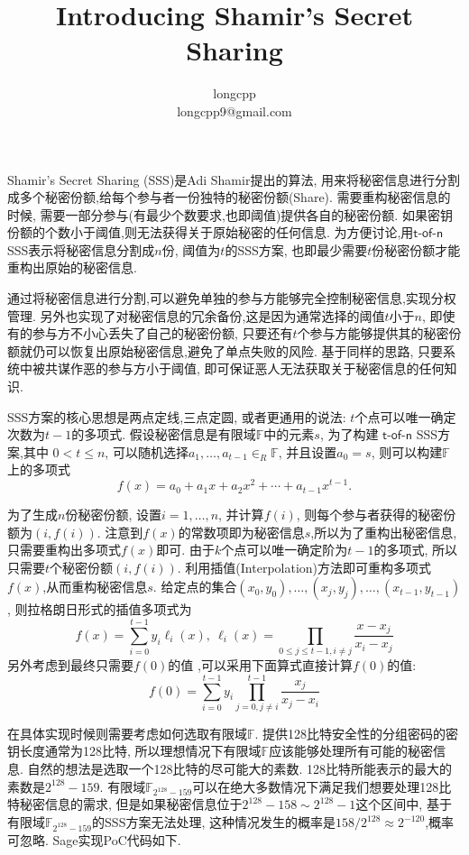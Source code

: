 \documentclass{article}
\newcommand{\F}{\mathbb{F}}
\begin{document}
\title{Introducing Shamir's Secret Sharing}
\author{longcpp \\ \small{longcpp9@gmail.com}}

\maketitle

Shamir’s Secret Sharing (SSS)是Adi Shamir提出的算法,
用来将秘密信息进行分割成多个秘密份额,给每个参与者一份独特的秘密份额(Share). 
需要重构秘密信息的时候, 需要一部分参与(有最少个数要求,也即阈值)提供各自的秘密份额. 
如果密钥份额的个数小于阈值,则无法获得关于原始秘密的任何信息.
为方便讨论,用$\textsf{t-of-n}$ SSS表示将秘密信息分割成$n$份, 阈值为$t$的SSS方案,
也即最少需要$t$份秘密份额才能重构出原始的秘密信息.

通过将秘密信息进行分割,可以避免单独的参与方能够完全控制秘密信息,实现分权管理. 
另外也实现了对秘密信息的冗余备份,这是因为通常选择的阈值$t$小于$n$, 
即使有的参与方不小心丢失了自己的秘密份额, 
只要还有$t$个参与方能够提供其的秘密份额就仍可以恢复出原始秘密信息,避免了单点失败的风险. 
基于同样的思路, 只要系统中被共谋作恶的参与方小于阈值,
即可保证恶人无法获取关于秘密信息的任何知识.

SSS方案的核心思想是两点定线,三点定圆,
或者更通用的说法: $t$个点可以唯一确定次数为$t-1$的多项式. 
假设秘密信息是有限域$\F$中的元素$s$, 
为了构建 $\textsf{t-of-n}$ SSS方案,其中 $0< t \leq n$,
可以随机选择$a_1,…,a_{t-1} \in_R \F$, 并且设置$a_0 = s$, 则可以构建$\F$上的多项式
$$
f(x)=a_0+a_1 x+a_2 x^2+ \cdots +a_{t-1} x^{t-1}.
$$ 

为了生成$n$份秘密份额, 设置$i=1, \ldots ,n$, 并计算$f(i)$, 则每个参与者获得的秘密份额为$(i,f(i))$. 
注意到$f(x)$的常数项即为秘密信息$s$,所以为了重构出秘密信息,只需要重构出多项式$f(x)$即可.
由于$k$个点可以唯一确定阶为$t-1$的多项式, 所以只需要$t$个秘密份额$(i,f(i))$.
利用插值(Interpolation)方法即可重构多项式$f(x)$,从而重构秘密信息$s$. 
给定点的集合$(x_0,y_0), \ldots ,(x_j,y_j), \ldots ,(x_{t-1},y_{t-1} )$,
则拉格朗日形式的插值多项式为
$$
f(x)=\sum_{i=0}^{t-1}y_i \ell_i (x),\ \ell_i (x)=\prod_{0 \leq j \leq t-1,i \neq j}\frac{x-x_j}{x_i-x_j}
$$
另外考虑到最终只需要$f(0)$的值 ,可以采用下面算式直接计算$f(0)$的值:
$$
f(0) = \sum_{i=0}^{t-1} y_i \prod_{j = 0, j \neq i}^{t-1}\frac{x_j}{x_j-x_i}
$$

在具体实现时候则需要考虑如何选取有限域$\F$. 
提供128比特安全性的分组密码的密钥长度通常为128比特,
所以理想情况下有限域$\F$应该能够处理所有可能的秘密信息.
自然的想法是选取一个128比特的尽可能大的素数.
128比特所能表示的最大的素数是$2^{128}-159$.
有限域$\F_{2^{128}-159}$可以在绝大多数情况下满足我们想要处理128比特秘密信息的需求,
但是如果秘密信息位于$2^{128}-158 \sim 2^{128}-1$这个区间中,
基于有限域$\F_{2^{128}-159}$的SSS方案无法处理,
这种情况发生的概率是$158/2^{128} \approx 2^{-120}$,概率可忽略.
Sage实现PoC代码如下.
\end{document}
